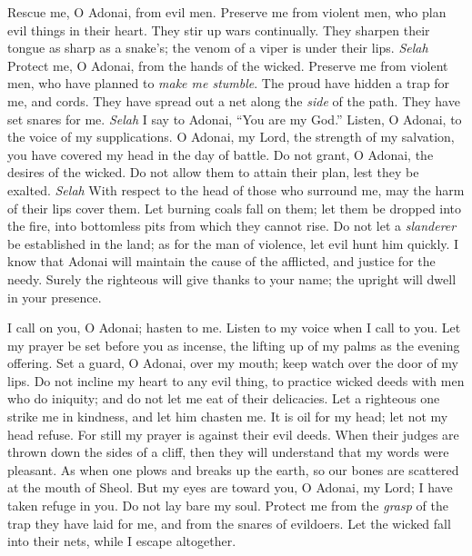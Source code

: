 \begin{biblechapter} %
 Rescue me, O Adonai, from evil men. 
Preserve me from violent men,
\verse who plan evil things in their heart. 
They stir up wars continually.
\verse They sharpen their tongue as sharp as a snake’s; 
the venom of a viper is under their lips. \textit{Selah}
\verse Protect me, O Adonai, from the hands of the wicked. 
Preserve me from violent men, 
who have planned to \textit{make me stumble}.
\verse The proud have hidden a trap for me, and cords. 
They have spread out a net along the \textit{side} of the path. 
They have set snares for me. \textit{Selah}
\verse I say to Adonai, “You are my God.” 
Listen, O Adonai, to the voice of my supplications.
\verse O Adonai, my Lord, the strength of my salvation, 
you have covered my head in the day of battle.
\verse Do not grant, O Adonai, the desires of the wicked. 
Do not allow them to attain their plan, lest they be exalted. \textit{Selah}
\verse With respect to the head of those who surround me, 
may the harm of their lips cover them.
\verse Let burning coals fall on them; 
let them be dropped into the fire, 
into bottomless pits from which they cannot rise.
\verse Do not let a \textit{slanderer} be established in the land; 
as for the man of violence, let evil hunt him quickly.
\verse I know that Adonai will maintain the cause of the afflicted, 
and justice for the needy.
\verse Surely the righteous will give thanks to your name; 
the upright will dwell in your presence.
\end{biblechapter}

\begin{biblechapter} %
 I call on you, O Adonai; hasten to me. 
Listen to my voice when I call to you.
\verse Let my prayer be set before you as incense, 
the lifting up of my palms as the evening offering.
\verse Set a guard, O Adonai, over my mouth; 
keep watch over the door of my lips.
\verse Do not incline my heart to any evil thing, 
to practice wicked deeds 
with men who do iniquity; 
and do not let me eat of their delicacies.
\verse Let a righteous one strike me in kindness, 
and let him chasten me. 
It is oil for my head; let not my head refuse. 
For still my prayer is against their evil deeds.
\verse When their judges are thrown down the sides of a cliff, 
then they will understand that my words were pleasant.
\verse As when one plows and breaks up the earth, 
so our bones are scattered at the mouth of Sheol.
\verse But my eyes are toward you, O Adonai, my Lord; 
I have taken refuge in you. Do not lay bare my soul.
\verse Protect me from the \textit{grasp} of the trap they have laid for me, 
and from the snares of evildoers.
\verse Let the wicked fall into their nets, 
while I escape altogether.
\end{biblechapter}

